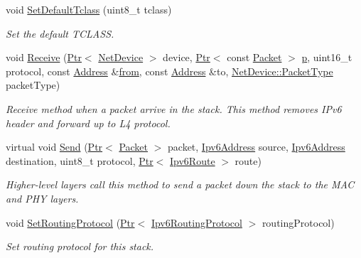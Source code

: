 \begin{DoxyCompactItemize}
void \hyperlink{classns3_1_1Ipv6L3Protocol_ac4da722470be0e2869f11b6835cc3579}{Set\+Default\+Tclass} (uint8\+\_\+t tclass)
\begin{DoxyCompactList}\small\item\em Set the default T\+C\+L\+A\+SS. \end{DoxyCompactList}\item 
void \hyperlink{classns3_1_1Ipv6L3Protocol_a8a95d576e8aee9a571db93bf686d850a}{Receive} (\hyperlink{classns3_1_1Ptr}{Ptr}$<$ \hyperlink{classns3_1_1NetDevice}{Net\+Device} $>$ device, \hyperlink{classns3_1_1Ptr}{Ptr}$<$ const \hyperlink{classns3_1_1Packet}{Packet} $>$ \hyperlink{lte__link__budget__x2__handover__measures_8m_ac9de518908a968428863f829398a4e62}{p}, uint16\+\_\+t protocol, const \hyperlink{classns3_1_1Address}{Address} \&\hyperlink{lte__amc_8m_a1b4c81ff74eb1a626b5ade44c81004b3}{from}, const \hyperlink{classns3_1_1Address}{Address} \&to, \hyperlink{classns3_1_1NetDevice_ace65153f09144f55a0d3e702fc29d6b2}{Net\+Device\+::\+Packet\+Type} packet\+Type)
\begin{DoxyCompactList}\small\item\em Receive method when a packet arrive in the stack. This method removes I\+Pv6 header and forward up to L4 protocol. \end{DoxyCompactList}\item 
virtual void \hyperlink{classns3_1_1Ipv6L3Protocol_ac281dd6c5aff55330904e7a298c1881b}{Send} (\hyperlink{classns3_1_1Ptr}{Ptr}$<$ \hyperlink{classns3_1_1Packet}{Packet} $>$ packet, \hyperlink{classns3_1_1Ipv6Address}{Ipv6\+Address} source, \hyperlink{classns3_1_1Ipv6Address}{Ipv6\+Address} destination, uint8\+\_\+t protocol, \hyperlink{classns3_1_1Ptr}{Ptr}$<$ \hyperlink{classns3_1_1Ipv6Route}{Ipv6\+Route} $>$ route)
\begin{DoxyCompactList}\small\item\em Higher-\/level layers call this method to send a packet down the stack to the M\+AC and P\+HY layers. \end{DoxyCompactList}\item 
void \hyperlink{classns3_1_1Ipv6L3Protocol_a9f65728e13ee4a2fb5588d3601e7634f}{Set\+Routing\+Protocol} (\hyperlink{classns3_1_1Ptr}{Ptr}$<$ \hyperlink{classns3_1_1Ipv6RoutingProtocol}{Ipv6\+Routing\+Protocol} $>$ routing\+Protocol)
\begin{DoxyCompactList}\small\item\em Set routing protocol for this stack. \end{DoxyCompactList}\item 

\end{DoxyCompactItemize}
